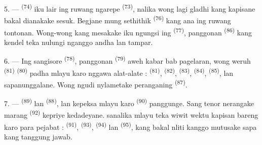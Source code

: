 5. ---  \textsuperscript{(74)} iku lair ing ruwang
ngarepe  \textsuperscript{(73)}, nalika wong lagi gladhi
 kang  kapisane bakal dianakake sesuk.
Begjane mung sethithik  \textsuperscript{(76)} kang
ana ing ruwang tontonan. Wong-wong kang mesakake iku ngungsi ing
 \textsuperscript{(77)}, panggonan  \textsuperscript{(86)} kang kendel teka nulungi nganggo andha lan
tampar.

6. --- Ing sangisore  \textsuperscript{(78)}, panggonan
 \textsuperscript{(79)} aweh kabar bab pagelaran, wong
weruh  \textsuperscript{(81)}
 \textsuperscript{(80)} padha mlayu karo nggawa
alat-alate :  \textsuperscript{(81)}, 
\textsuperscript{(82)},  \textsuperscript{(83)},
 \textsuperscript{(84)}, 
\textsuperscript{(85)}, lan sapanunggalane. Wong ngudi nylametake
peranganing  \textsuperscript{(87)}.

7. ---  \textsuperscript{(89)} lan  \textsuperscript{(88)},  lan
 kepeksa mlayu karo 
\textsuperscript{(90)} panggunge. Sang tenor nerangake marang
 \textsuperscript{(92)} kepriye kedadeyane.
 sanalika mlayu teka wiwit wektu kapisan bareng
karo para pejabat :  \textsuperscript{(91)},
 \textsuperscript{(93)}, 
\textsuperscript{(94)} lan  \textsuperscript{(95)}, kang
bakal nliti kanggo mutusake sapa kang tanggung jawab.

\VUsaut{6.0mm}
\VUfilet{22mm}
